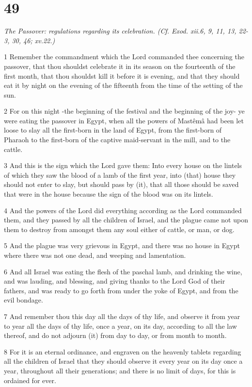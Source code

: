 \chapter{49}

\par \textit{The Passover: regulations regarding its celebration. (Cf. Exod. xii.6, 9, 11, 13, 22-3, 30, 46; xv.22.)}

\par 1 Remember the commandment which the Lord commanded thee concerning the passover, that thou shouldst celebrate it in its season on the fourteenth of the first month, that thou shouldst kill it before it is evening, and that they should eat it by night on the evening of the fifteenth from the time of the setting of the sun.
\par 2 For on this night -the beginning of the festival and the beginning of the joy- ye were eating the passover in Egypt, when all the powers of Mastêmâ had been let loose to slay all the first-born in the land of Egypt, from the first-born of Pharaoh to the first-born of the captive maid-servant in the mill, and to the cattle.
\par 3 And this is the sign which the Lord gave them: Into every house on the lintels of which they saw the blood of a lamb of the first year, into (that) house they should not enter to slay, but should pass by (it), that all those should be saved that were in the house because the sign of the blood was on its lintels.
\par 4 And the powers of the Lord did everything according as the Lord commanded them, and they passed by all the children of Israel, and the plague came not upon them to destroy from amongst them any soul either of cattle, or man, or dog.
\par 5 And the plague was very grievous in Egypt, and there was no house in Egypt where there was not one dead, and weeping and lamentation.
\par 6 And all Israel was eating the flesh of the paschal lamb, and drinking the wine, and was lauding, and blessing, and giving thanks to the Lord God of their fathers, and was ready to go forth from under the yoke of Egypt, and from the evil bondage.
\par 7 And remember thou this day all the days of thy life, and observe it from year to year all the days of thy life, once a year, on its day, according to all the law thereof, and do not adjourn (it) from day to day, or from month to month.
\par 8 For it is an eternal ordinance, and engraven on the heavenly tablets regarding all the children of Israel that they should observe it every year on its day once a year, throughout all their generations; and there is no limit of days, for this is ordained for ever.
